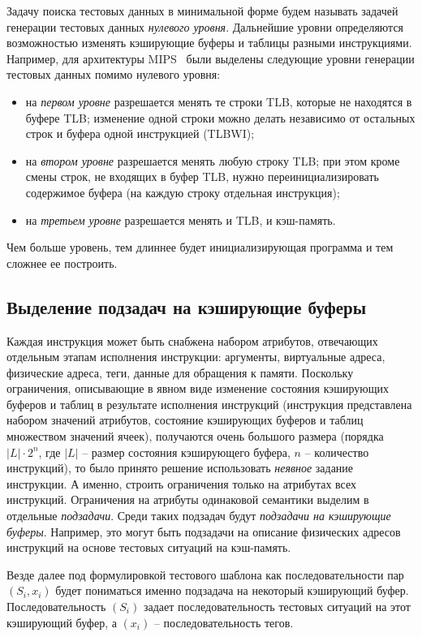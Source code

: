 Задачу поиска тестовых данных в минимальной форме будем называть
задачей генерации тестовых данных \emph{нулевого уровня}. Дальнейшие
уровни определяются возможностью изменять кэширующие буферы и
таблицы разными инструкциями. Например, для архитектуры
MIPS~\cite{mips64_II} были выделены следующие уровни генерации
тестовых данных помимо нулевого уровня:
\begin{itemize}
\item на \emph{первом уровне} разрешается менять те строки TLB,
которые не находятся в буфере TLB; изменение одной строки можно
делать независимо от остальных строк и буфера одной инструкцией
(TLBWI);
\item на \emph{втором уровне} разрешается менять любую строку TLB;
при этом кроме смены строк, не входящих в буфер TLB, нужно
переинициализировать содержимое буфера (на каждую строку отдельная
инструкция);
\item на \emph{третьем уровне} разрешается менять и TLB, и кэш-память.
\end{itemize}

Чем больше уровень, тем длиннее будет инициализирующая программа и
тем сложнее ее построить.

\subsection{Выделение подзадач на кэширующие буферы}\label{module_algorithm}

Каждая инструкция может быть снабжена набором атрибутов, отвечающих
отдельным этапам исполнения инструкции: аргументы, виртуальные
адреса, физические адреса, теги, данные для обращения к памяти.
Поскольку ограничения, описывающие в явном виде изменение состояния
кэширующих буферов и таблиц в результате исполнения инструкций
(инструкция представлена набором значений атрибутов, состояние
кэширующих буферов и таблиц множеством значений ячеек), получаются
очень большого размера (порядка $|L| \cdot 2^n$, где $|L|$ -- размер
состояния кэширующего буфера, $n$ -- количество инструкций), то было
принято решение использовать \emph{неявное} задание инструкции. А
именно, строить ограничения только на атрибутах всех инструкций.
Ограничения на атрибуты одинаковой семантики выделим в отдельные
\emph{подзадачи}. Среди таких подзадач будут \emph{подзадачи на
кэширующие буферы}. Например, это могут быть подзадачи на описание
физических адресов инструкций на основе тестовых ситуаций на
кэш-память.

Везде далее под формулировкой тестового шаблона как
последовательности пар $(S_i, x_i)$ будет пониматься именно
подзадача на некоторый кэширующий буфер. Последовательность $(S_i)$
задает последовательность тестовых ситуаций на этот кэширующий
буфер, а $(x_i)$ -- последовательность тегов.

